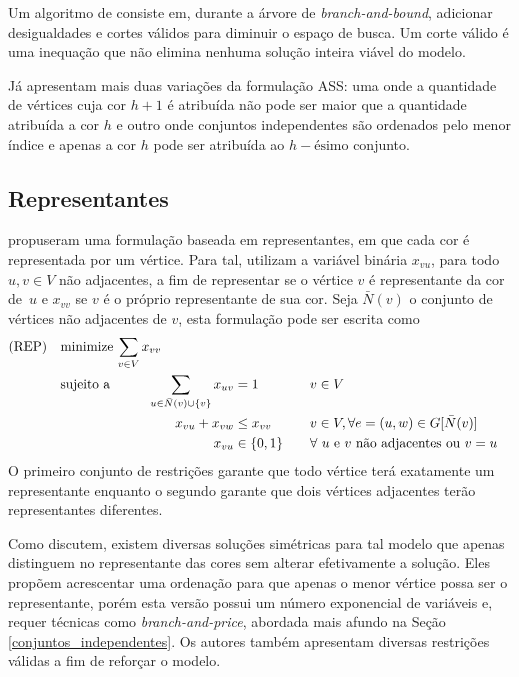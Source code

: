 \documentclass[11pt]{article}
\providecommand{\DIFaddtex}[1]{{\protect\color{blue}{#1}}} %
\providecommand{\DIFaddbegin}{} %
\providecommand{\DIFaddend}{} %
\providecommand{\DIFadd}[1]{\texorpdfstring{\DIFaddtex{#1}}{#1}} %
\newcommand{\DIFaddincludegraphics}[2][]{{\color{blue}\fbox{\DIFOincludegraphics[#1]{#2}}}} %
\DeclareRobustCommand{\DIFaddbegin}{\DIFOaddbegin \let\includegraphics\DIFaddincludegraphics} %
\DeclareRobustCommand{\DIFaddend}{\DIFOaddend \let\includegraphics\DIFOincludegraphics} %
\begin{document}
Um algoritmo de \emph{\DIFaddbegin\DIFadd{branch-and-cut}\DIFaddend } consiste em, durante a árvore de \emph{branch-and-bound}, adicionar desigualdades e cortes válidos para diminuir o espaço de busca.
Um corte válido é uma inequação que não elimina nenhuma solução inteira viável do modelo.

Já \textcite{MendezDiaz2008CuttingPlaneAlgorithm} apresentam mais duas variações da formulação ASS: uma onde a quantidade de vértices cuja cor \(h+1\) é atribuída não pode ser maior que a quantidade atribuída a cor \(h\) e outro onde conjuntos independentes são ordenados pelo menor índice e apenas a cor \(h\) pode ser atribuída ao \(h-\text{ésimo}\) conjunto.

\subsection{Representantes}
 \DIFaddbegin \label{sec:orge2b6344}
\DIFaddend \textcite{Campelo2004CliquesHolesVertex} propuseram uma formulação baseada em representantes, em que cada cor é representada por um vértice.
Para tal, utilizam a variável binária \(x_{vu}\), para todo \(u, v \in V\) não adjacentes, a fim de representar se o vértice \(v\) é representante da cor de~\(u\) e \(x_{vv}\) se \(v\) é o próprio representante de sua cor.
Seja \(\bar{N}(v)\) o conjunto de vértices não adjacentes de \(v\), esta formulação pode ser escrita como
\begin{alignat*}{4}
\mathrm{(REP)} \quad & \omit\rlap{minimize  $\displaystyle \sum_{v \in V} x_{vv}$} \\
& \mbox{sujeito a}&& \quad & \sum_{u \in \bar{N}(v) \cup \{v\}} x_{uv}&= 1        & \quad & v \in V \\
&                 &&   & x_{vu} + x_{vw}    & \leq x_{vv} &   & v \in V, \forall e = (u,w) \in G[\bar{N}(v)] \\
&                 &&   & x_{vu}       & \in \{0,1\} &   & \forall \text{ $u$ e $v$ não adjacentes ou $v = u$}
\end{alignat*}
O primeiro conjunto de restrições garante que todo vértice terá exatamente um representante enquanto o segundo garante que dois vértices adjacentes terão representantes diferentes.

Como \textcite{Campelo2008AsymmetricRepresentativesFormulation} discutem, existem diversas soluções simétricas para tal modelo que apenas distinguem no representante das cores sem alterar efetivamente a solução.
Eles propõem acrescentar uma ordenação para que apenas o menor vértice possa ser o representante, porém esta versão possui um número exponencial de variáveis e, \DIFaddbegin \DIFadd{portanto, }\DIFaddend requer técnicas como \emph{branch-and-price}, abordada mais afundo na Seção \ref{conjuntos_independentes}.
Os autores também apresentam diversas restrições válidas a fim de reforçar o modelo.
\end{document}
